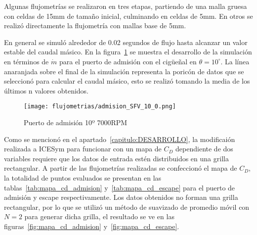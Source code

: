 
Algunas flujometrías se realizaron en tres etapas, partiendo de una malla gruesa
con celdas de 15mm de tamaño inicial, culminando en celdas de 5mm.
%
En otros se realizó directamente la flujometría con mallas base de 5mm.

En general se simuló alrededor de 0.02 segundos de flujo  hasta alcanzar un
valor estable del caudal másico.
%
En la figura~\ref{fig:adm_10_7000rpm} se muestra el desarrollo de la simulación
en términos de $\dot{m}$ para el puerto de admisión con el cigüeñal en
$\theta=10^{\circ}$.
%
La línea anaranjada sobre el final de la simulación representa la poricón de
datos que se seleccionó para calcular el caudal másico, esto se realizó tomando
la media de los últimos n valores obtenidos.

\begin{figure}[ht]
  \centering
  \texttt{[image: flujometrias/admision\_SFV\_10\_0.png]}
  \caption{Puerto de admisión 10º \@ 7000RPM}\label{fig:adm_10_7000rpm}
\end{figure}

Como se mencionó en el apartado~\ref{capitulo:DESARROLLO}, la modificaión
realizada a ICESym para funcionar con un mapa de $C_{D}$ dependiente de dos
variables requiere que los datos de entrada estén distribuidos en una grilla
rectangular.
%
A partir de las flujometrías realizadas se confeccionó el mapa de $C_{D}$, la
totalidad de puntos evaluados se presentan en las
tablas~\ref{tab:mapa_cd_admision} y~\ref{tab:mapa_cd_escape} para el puerto de
admisión y escape respectivamente.
%
Los datos obtenidos no forman una grilla rectangular, por lo que se utilizó
un método de suavizado de promedio móvil con $N=2$ para generar dicha grilla, el
resultado se ve en las figuras~\ref{fig:mapa_cd_admision}
y~\ref{fig:mapa_cd_escape}.

